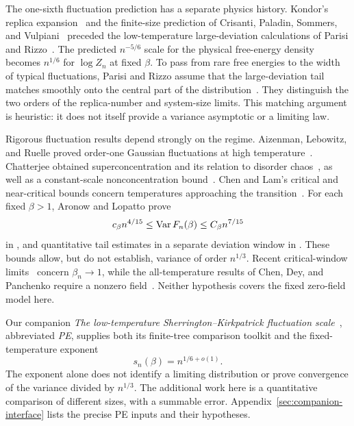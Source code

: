 The one-sixth fluctuation prediction has a separate physics history.
Kondor's replica expansion~\cite{Kondor1983} and the finite-size
prediction of Crisanti, Paladin, Sommers, and Vulpiani~\cite{CPSV1992}
preceded the low-temperature large-deviation calculations of Parisi
and Rizzo~\cite{ParisiRizzo2008,ParisiRizzo2009}. The predicted
$n^{-5/6}$ scale for the physical free-energy density becomes
$n^{1/6}$ for $\log Z_n$ at fixed $\beta$. To pass from rare
free energies to the width of typical fluctuations, Parisi and Rizzo
assume that the large-deviation tail matches smoothly onto the
central part of the distribution~\cite[Section~VI]{ParisiRizzo2009}.
They distinguish the two orders of the replica-number and system-size
limits. This matching argument is heuristic: it does not itself
provide a variance asymptotic or a limiting law.

Rigorous fluctuation results depend strongly on the regime.
Aizenman, Lebowitz, and Ruelle proved order-one Gaussian fluctuations
at high temperature~\cite{AizenmanLebowitzRuelle1987}.
Chatterjee obtained superconcentration and its relation to disorder
chaos~\cite{Chatterjee2009}, as well as a constant-scale
nonconcentration bound~\cite{Chatterjee2019LowerBounds}.
Chen and Lam's critical and near-critical bounds concern temperatures
approaching the transition~\cite{ChenLam2019Critical}.
For each fixed $\beta>1$, Aronow and Lopatto prove
\[
 c_\beta n^{4/15}\le \operatorname{Var} F_n(\beta)\le C_\beta n^{7/15}
\]
in \cite[Theorem~1.4]{AL2026}, and quantitative tail estimates in a
separate deviation window in \cite[Theorem~1.5]{AL2026}.
These bounds allow, but do not establish, variance of order $n^{1/3}$.
Recent critical-window limits~\cite[Theorem~2.1]{ChengLiuShaoXu2026CriticalWindow}
concern $\beta_n\to1$, while the all-temperature results of
Chen, Dey, and Panchenko require a nonzero field~\cite{ChenDeyPanchenko2017}.
Neither hypothesis covers the fixed zero-field model here.

Our companion \emph{The low-temperature Sherrington--Kirkpatrick
fluctuation scale}~\cite{PE}, abbreviated \emph{PE}, supplies both its
finite-tree comparison toolkit and the fixed-temperature exponent
\begin{equation}\label{eq:PE-exponent}
 s_n(\beta)=n^{1/6+o(1)}.
\end{equation}
The exponent alone does not identify a limiting distribution or prove
convergence of the variance divided by $n^{1/3}$. The additional work
here is a quantitative comparison of different sizes, with a summable
error. Appendix~\ref{sec:companion-interface} lists the precise PE
inputs and their hypotheses.

